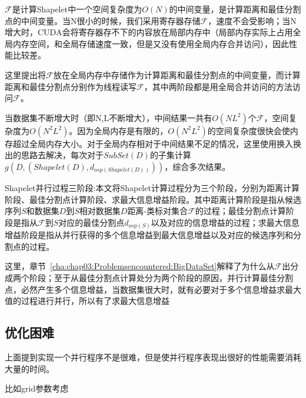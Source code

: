$\mathcal{F}$是计算Shapelet中一个空间复杂度为$O(N)$的中间变量，是计算距离和最佳分割点的中间变量。当N很小的时候，我们采用寄存器存储$\mathcal{F}$，速度不会受影响；当N增大时，CUDA会将寄存器存不下的内容放在局部内存中（局部内存实际上占用全局内存空间，和全局存储速度一致，但是又没有使用全局内存合并访问），因此性能比较差。

这里提出将$\mathcal{F}$放在全局内存中存储作为计算距离和最佳分割点的中间变量，而计算距离和最佳分割点分别作为线程读写$\mathcal{F}$，其中两阶段都是用全局合并访问的方法访问$\mathcal{F}$。

当数据集不断增大时（即N,L不断增大），中间结果一共有$O(NL^2)$个$\mathcal{F}$，空间复杂度为$O(N^2L^2)$。因为全局内存是有限的，$O(N^2L^2)$的空间复杂度很快会使内存超过全局内存大小。对于全局内存相对于中间结果不足的情况，这里使用换入换出的思路去解决，每次对于$SubSet(D)$的子集计算$g(D,(Shapelet(D),d_{osp(Shapelet(D))}))$，综合多次结果。

\begin{definition}
	\label{def:chap03:Threephases}
	Shapelet并行过程三阶段:本文将Shapelet计算过程分为三个阶段，分别为距离计算阶段、最佳分割点计算阶段、求最大信息增益阶段。其中距离计算阶段是指从候选序列$S$和数据集$D$到$S$相对数据集$D$距离-类标对集合$\mathcal{F}$的过程；最佳分割点计算阶段是指从$\mathcal{F}$到$S$对应的最佳分割点$d_{osp(S)}$以及对应的信息增益的过程；求最大信息增益阶段是指从并行获得的多个信息增益到最大信息增益以及对应的候选序列和分割点的过程。
	
	这里，章节~\ref{cha:chap03:Problemsencountered:BigDataSet}解释了为什么从$\mathcal{F}$出分成两个阶段；至于从最佳分割点计算处分为两个阶段的原因，并行计算最佳分割点，必然产生多个信息增益，当数据集很大时，就有必要对于多个信息增益求最大值的过程进行并行，所以有了求最大信息增益
\end{definition}


\subsection{优化困难}

上面提到实现一个并行程序不是很难，但是使并行程序表现出很好的性能需要消耗大量的时间。

比如grid参数考虑



